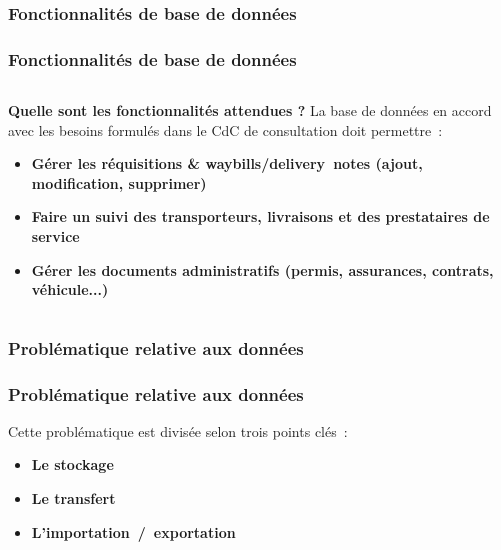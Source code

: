 \subsubsection[Fonctionnalités de base de données]{Fonctionnalités de base de données}
\begin{frame}
\frametitle{Fonctionnalités de base de données}
\begin{columns}[c]
\begin{column}{12cm}
\begin{block}{\textbf{Quelle sont les fonctionnalités attendues ?}}
La base de données en accord avec les besoins formulés dans le CdC de consultation doit permettre~:
\begin{itemize}
\item<2-> \textbf{Gérer les réquisitions \& waybills/delivery~notes (ajout, modification, supprimer)}
\item<3-> \textbf{Faire un suivi des transporteurs, livraisons et des prestataires de service}
\item<4-> \textbf{Gérer les documents administratifs (permis, assurances, contrats, véhicule...)}
\end{itemize}
\end{block}
\end{column}
\end{columns}
\end{frame}

\subsubsection[Problématique relative aux données]{Problématique relative aux données}
\begin{frame}
\frametitle{Problématique relative aux données}
Cette problématique est divisée selon trois points clés~:
\begin{itemize}
	\item<2-> \textbf{Le stockage}
	\item<3-> \textbf{Le transfert}
	\item<4-> \textbf{L'importation~/~exportation}
\end{itemize}
\end{frame}

